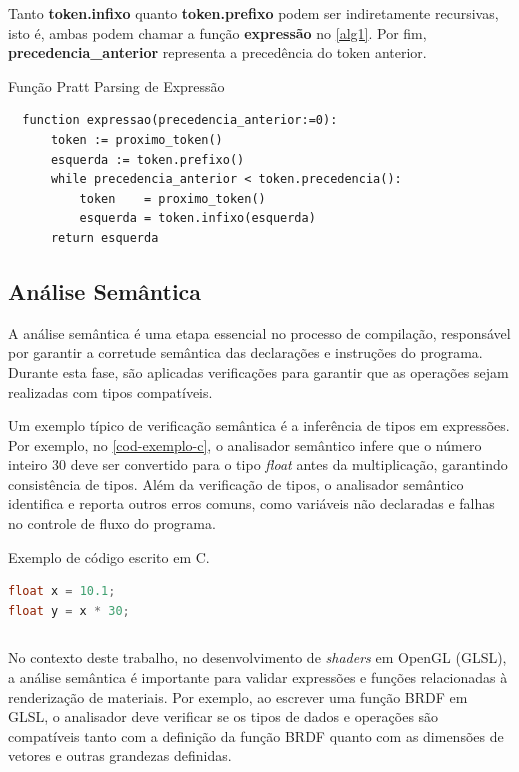 \documentclass[english, 
               brazil, 
               bsc] %
               {dcomp-abntex2}
\begin{document}
Tanto \textbf{token.infixo} quanto \textbf{token.prefixo} podem ser indiretamente recursivas, isto é, ambas podem chamar a função \textbf{expressão} no \autoref{alg1}. 
Por fim, \textbf{precedencia\_anterior} representa a precedência do token anterior.

\begin{algoritmo}[H]
	\caption{Função Pratt Parsing de Expressão}
	\label{alg1}
  \begin{lstlisting}
  function expressao(precedencia_anterior:=0):
      token := proximo_token()
      esquerda := token.prefixo()
      while precedencia_anterior < token.precedencia():
          token    = proximo_token()
          esquerda = token.infixo(esquerda)
      return esquerda
  \end{lstlisting}
\end{algoritmo}

\subsection{Análise Semântica}

A análise semântica é uma etapa essencial no processo de compilação, responsável por garantir a corretude semântica das declarações e instruções do programa. Durante esta fase, são aplicadas verificações para garantir que as operações sejam realizadas com tipos compatíveis.

Um exemplo típico de verificação semântica é a inferência de tipos em expressões. Por exemplo, no \autoref{cod-exemplo-c}, o analisador semântico infere que o número inteiro $30$ deve ser convertido para o tipo \textit{float} antes da multiplicação, garantindo consistência de tipos. Além da verificação de tipos, o analisador semântico identifica e reporta outros erros comuns, como variáveis não declaradas e falhas no controle de fluxo do programa.

\begin{codigo}
\caption{\small Exemplo de código escrito em C.}
  \label{cod-exemplo-c}
\begin{lstlisting}[language=C]
float x = 10.1;
float y = x * 30;
\end{lstlisting}
\end{codigo}

\begin{lstlisting}
\end{lstlisting}


No contexto deste trabalho, no desenvolvimento de \textit{shaders} em OpenGL (GLSL), a análise semântica é importante para validar expressões e funções relacionadas à renderização de materiais. Por exemplo, ao escrever uma função BRDF em GLSL, o analisador deve verificar se os tipos de dados e operações são compatíveis tanto com a definição da função BRDF quanto com as dimensões de vetores e outras grandezas definidas.
\end{document}
